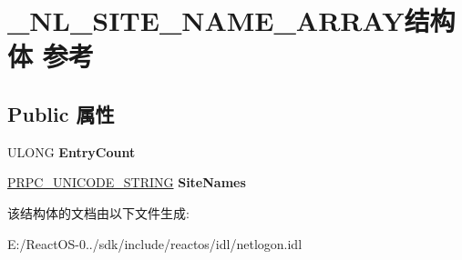 \hypertarget{struct___n_l___s_i_t_e___n_a_m_e___a_r_r_a_y}{}\section{\+\_\+\+N\+L\+\_\+\+S\+I\+T\+E\+\_\+\+N\+A\+M\+E\+\_\+\+A\+R\+R\+A\+Y结构体 参考}
\label{struct___n_l___s_i_t_e___n_a_m_e___a_r_r_a_y}
\subsection*{Public 属性}
\begin{DoxyCompactItemize}
\item 
\mbox{\label{struct___n_l___s_i_t_e___n_a_m_e___a_r_r_a_y_a5c7c5ad69c05cda8527e642504bd9307}} 
U\+L\+O\+NG {\bfseries Entry\+Count}
\item 
\mbox{\label{struct___n_l___s_i_t_e___n_a_m_e___a_r_r_a_y_a7cdacbb84a5e5e05ab688f0926b50420}} 
\hyperlink{struct___r_p_c___u_n_i_c_o_d_e___s_t_r_i_n_g}{P\+R\+P\+C\+\_\+\+U\+N\+I\+C\+O\+D\+E\+\_\+\+S\+T\+R\+I\+NG} {\bfseries Site\+Names}
\end{DoxyCompactItemize}


该结构体的文档由以下文件生成\+:\begin{DoxyCompactItemize}
\item 
E\+:/\+React\+O\+S-\/0../sdk/include/reactos/idl/netlogon.\+idl\end{DoxyCompactItemize}
